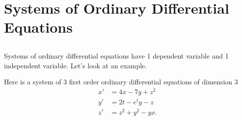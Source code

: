 \newpage
\section{Systems of Ordinary Differential Equations}
\subsection{}
Systems of ordinary differential equations have 1 dependent variable and 1 independent variable. Let's look at an example.

\begin{eg}
  Here is a system of 3 first order ordinary differential equations of dimension 3 
  \begin{align*}
    x'&=4x-7y+z^2\\
    y'&=2t-e^{t}y-z\\
    z'&=z^2+y^2-yx
  .\end{align*}
\end{eg}

